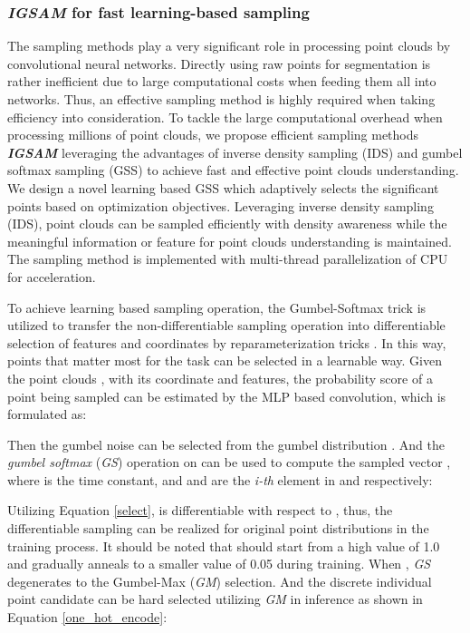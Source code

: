 \documentclass[journal]{IEEEtran}
\begin{document}
\subsubsection{\textit{\textbf{IGSAM}} for fast learning-based sampling}
The sampling methods play a very significant role in processing point clouds by convolutional neural networks.  Directly using raw points for segmentation is rather inefficient due to large computational costs when feeding them all into networks. Thus, an effective sampling method is highly required when taking efficiency into consideration. To tackle the large computational overhead when processing millions of point clouds, we propose efficient sampling methods \textit{\textbf{IGSAM}} leveraging the advantages of inverse density sampling (IDS) and gumbel softmax sampling (GSS) to achieve fast and effective point clouds understanding. We design a novel learning based GSS which adaptively selects the significant points based on optimization objectives. Leveraging inverse density sampling (IDS), point clouds can be sampled efficiently with density awareness while the meaningful information or feature for point clouds understanding is maintained. The sampling method is implemented with multi-thread parallelization of CPU for acceleration.
















To achieve learning based sampling operation, the Gumbel-Softmax trick is utilized to transfer the non-differentiable sampling operation into differentiable selection of features and coordinates by reparameterization tricks \cite{maddison2016concrete}. In this way, points that matter most for the task can be selected in a learnable way. Given the point clouds , with its coordinate and features, the probability score  of a point being sampled can be estimated by the MLP based  convolution, which is formulated as:

 Then the gumbel noise \cite{maddison2016concrete}  can be selected from the gumbel distribution . And the \textit{gumbel softmax} (\textit{GS}) operation on  can be used to compute the sampled vector , where  is the time constant, and  and  are the \textit{i-th} element in  and  respectively:

Utilizing Equation \ref{select},  is differentiable with respect to , thus, the differentiable sampling can be realized for original point distributions in the training process. It should be noted that  should start from a high value of 1.0 and gradually anneals to a smaller value of 0.05 during training.
 When , \textit{GS} degenerates to the Gumbel-Max (\textit{GM}) selection. And the discrete individual point candidate can be hard selected utilizing \textit{GM} in inference as shown in Equation \ref{one_hot_encode}:
 
\end{document}
